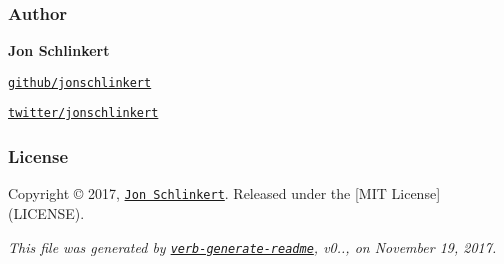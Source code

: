 \subsubsection*{Author}

{\bfseries Jon Schlinkert}


\begin{DoxyItemize}
\item \href{https://github.com/jonschlinkert}{\tt github/jonschlinkert}
\item \href{https://twitter.com/jonschlinkert}{\tt twitter/jonschlinkert}
\end{DoxyItemize}

\subsubsection*{License}

Copyright © 2017, \href{https://github.com/jonschlinkert}{\tt Jon Schlinkert}. Released under the \mbox{[}M\+IT License\mbox{]}(L\+I\+C\+E\+N\+SE).





{\itshape This file was generated by \href{https://github.com/verbose/verb-generate-readme}{\tt verb-\/generate-\/readme}, v0.., on November 19, 2017.} 